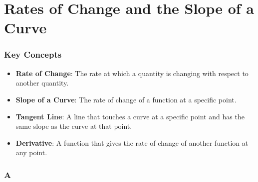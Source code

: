 \section{Rates of Change and the Slope of a Curve}
\subsubsection*{Key Concepts}

\begin{itemize}
    \item \textbf{Rate of Change}: The rate at which a quantity is changing with respect to another quantity.
    \item \textbf{Slope of a Curve}: The rate of change of a function at a specific point.
    \item \textbf{Tangent Line}: A line that touches a curve at a specific point and has the same slope as the curve at that point.
    \item \textbf{Derivative}: A function that gives the rate of change of another function at any point.
\end{itemize}
\subsubsection{A}
\begin{multicols}{2}

\columnbreak







\end{multicols}
